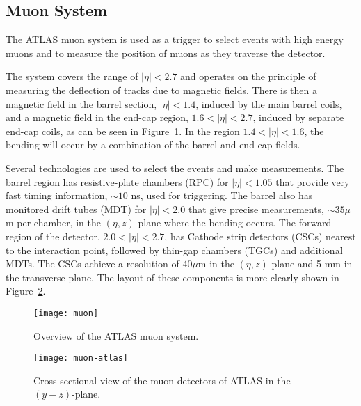 \subsection{Muon System}

The ATLAS muon system is used as a trigger to select events with high energy muons and to measure the position of muons
as they traverse the detector.


The system covers the range of $|\eta| < 2.7$ and operates on the principle of measuring the deflection of tracks due to magnetic fields.
There is then a magnetic field in the barrel section, $|\eta| < 1.4$, induced by the main barrel coils, 
and a magnetic field in the end-cap region, $1.6 < |\eta| < 2.7$, induced by separate end-cap coils, as can be 
seen in Figure~\ref{fig:exp.atlas.muon.all}.
In the region $1.4 < |\eta| < 1.6$, the bending will occur by a combination of the barrel and end-cap fields.

Several technologies are used to select the events and make measurements.
The barrel region has resistive-plate chambers (RPC) for $|\eta| < 1.05$  that provide very fast timing information, $\sim 10$ ns,
used for triggering. The barrel also has monitored drift tubes (MDT) for $|\eta| < 2.0$ that give precise measurements, $\sim 35 \mu$m per chamber,
in the $\left(\eta,z\right)$-plane where the bending occurs.
The forward region of the detector, $2.0 < |\eta| < 2.7$,  has Cathode strip detectors (CSCs)  nearest to the interaction point,
followed by thin-gap chambers (TGCs) and additional MDTs. The CSCs achieve a resolution of 40$\mu$m in the $\left(\eta,z\right)$-plane
and 5 mm in the transverse plane.
The layout of these components is more clearly shown in Figure~\ref{fig:exp.atlas.muon}.


\begin{figure}[htb!]
\centering
\texttt{[image: muon]}
\caption{Overview of the ATLAS muon system.}%
\label{fig:exp.atlas.muon.all}
\end{figure} 


\begin{figure}[htb!]
\centering
\texttt{[image: muon-atlas]}
\caption{Cross-sectional view of the muon detectors of ATLAS in the $\left(y-z\right)$-plane.}%
\label{fig:exp.atlas.muon}
\end{figure} 

